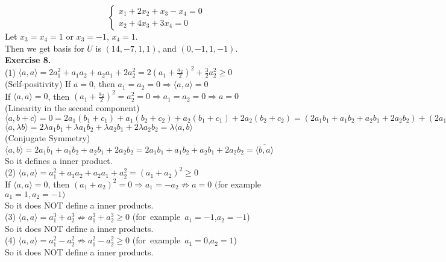 \documentclass[12pt]{article}
\begin{document}
\begin{equation*}
\begin{cases}
x_1+2x_2+x_3-x_4=0\\
x_2+4x_3+3x_4=0
\end{cases}
\end{equation*}
Let $x_3=x_4=1$ or $x_3=-1$, $x_4=1$.\\
Then we get basis for $U$ is $(14,-7,1,1)$, and $(0,-1,1,-1)$.
\\[1em]
{\bf Exercise 8.}\\
(1)
$\langle a,a\rangle=2a_1^2+a_1a_2+a_2a_1+2a_2^2=2(a_1+\frac{a_2}{2})^2+\frac{3}{2}a_2^2\ge0$\\
(Self-positivity)
If $a=0$, then $a_1=a_2=0\Longrightarrow\langle a,a\rangle=0$\\
If $\langle a,a\rangle=0$, then $(a_1+\frac{a_2}{2})^2=a_2^2=0\Longrightarrow a_1=a_2=0\Longrightarrow a=0$\\
(Linearity in the second component) $\langle a,b+c\rangle=0=2a_1(b_1+c_1)+a_1(b_2+c_2)+a_2(b_1+c_1)+2a_2(b_2+c_2)=(2a_1b_1+a_1b_2+a_2b_1+2a_2b_2)+(2a_1c_1+a_1c_2+a_2c_1+2a_2c_2)=\langle a,b\rangle+\langle a,c\rangle$\\
$\langle a,\lambda b\rangle=2\lambda a_1b_1+\lambda a_1b_2+\lambda a_2b_1 +2\lambda a_2b_2=\lambda\langle a,b\rangle$\\
(Conjugate Symmetry)$\langle a,b\rangle=2a_1b_1+a_1b_2+a_2b_1 +2a_2b_2=\overline{2a_1b_1+a_1b_2+a_2b_1 +2a_2b_2}=\overline{\langle b,a\rangle}$\\
So it defines a inner product.\\[0.5 em]
(2)
$\langle a,a\rangle=a_1^2+a_1a_2+a_2a_1+a_2^2=(a_1+a_2)^2\ge0$\\
If $\langle a,a\rangle=0$, then $(a_1+a_2)^2=0\Longrightarrow a_1=-a_2\not\Longrightarrow a=0$ $($for example $a_1=1,a_2=-1)$\\
So it does NOT define a inner products.\\[0.5 em]
(3)
$ \langle a,a\rangle=a_1^3+a_2^3\not\Longrightarrow a_1^3+a_2^3\ge0$ (for~example~$a_1=-1$,$a_2=-1$)\\
So it does NOT define a inner products.\\[0.5 em]
(4)
$\langle a,a\rangle=a_1^2-a_2^2\not\Longrightarrow a_1^2-a_2^2\ge0$ (for~example~$a_1=0$,$a_2=1$)\\
So it does NOT define a inner products.
\end{document}
